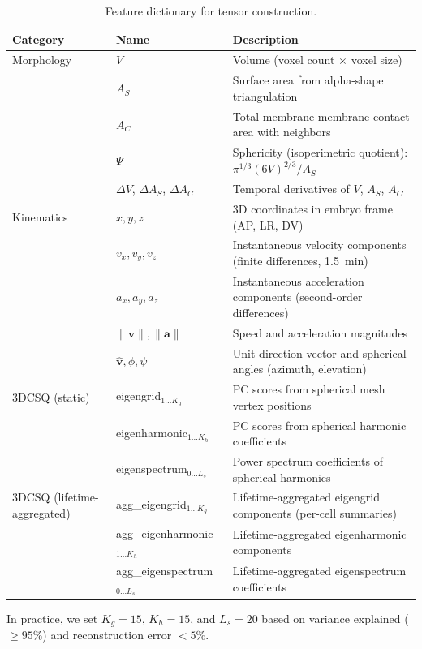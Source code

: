 \documentclass[unnumsec,webpdf,modern,large,namedate]{oup-authoring-template}%
\theoremstyle{thmstyleone}\newtheorem{theorem}{Theorem}
\theoremstyle{thmstyletwo}\newtheorem{example}{Example}
\theoremstyle{thmstylethree}\newtheorem{definition}{Definition}
\begin{document}
\begin{table}[t]
\centering
\caption{Feature dictionary for tensor construction.}
\label{tab:feature-dict}
\begin{tabular}{llp{8cm}}
\toprule
\textbf{Category} & \textbf{Name} & \textbf{Description} \\
\midrule
Morphology & $V$ & Volume (voxel count $\times$ voxel size) \\
 & $A_S$ & Surface area from alpha-shape triangulation \\
 & $A_C$ & Total membrane-membrane contact area with neighbors \\
 & $\Psi$ & Sphericity (isoperimetric quotient): $\pi^{1/3}(6V)^{2/3}/A_S$ \\
 & $\Delta V$, $\Delta A_S$, $\Delta A_C$ & Temporal derivatives of $V$, $A_S$, $A_C$ \\
\midrule
Kinematics & $x,y,z$ & 3D coordinates in embryo frame (AP, LR, DV) \\
 & $v_x,v_y,v_z$ & Instantaneous velocity components (finite differences, 1.5~min) \\
 & $a_x,a_y,a_z$ & Instantaneous acceleration components (second-order differences) \\
 & $\|\mathbf v\|,\|\mathbf a\|$ & Speed and acceleration magnitudes \\
 & $\hat{\mathbf v},\phi,\psi$ & Unit direction vector and spherical angles (azimuth, elevation) \\
\midrule
3DCSQ (static) & eigengrid$_{1\ldots K_g}$ & PC scores from spherical mesh vertex positions \\
 & eigenharmonic$_{1\ldots K_h}$ & PC scores from spherical harmonic coefficients \\
 & eigenspectrum$_{0\ldots L_s}$ & Power spectrum coefficients of spherical harmonics \\
\midrule
3DCSQ (lifetime-aggregated) & agg\_eigengrid$_{1\ldots K_g}$ & Lifetime-aggregated eigengrid components (per-cell summaries) \\
 & agg\_eigenharmonic$_{1\ldots K_h}$ & Lifetime-aggregated eigenharmonic components \\
 & agg\_eigenspectrum$_{0\ldots L_s}$ & Lifetime-aggregated eigenspectrum coefficients \\
\bottomrule
\end{tabular}
\end{table}

In practice, we set $K_g = 15$, $K_h = 15$, and $L_s = 20$ based on variance explained ($\geq 95\%$) and reconstruction error $< 5\%$.
 
\end{document}
